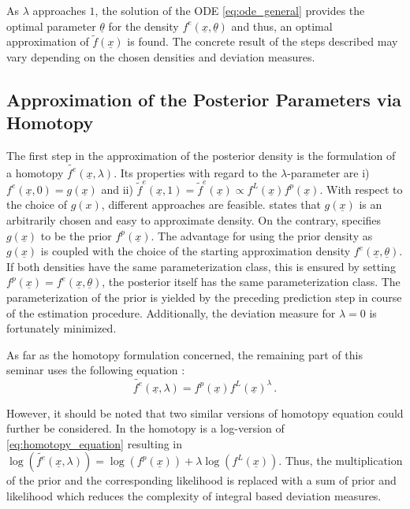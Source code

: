\documentclass[a4paper]{IEEEtran}
\begin{document}
As $\lambda$ approaches $1$, the solution of the ODE \eqref{eq:ode_general} provides the optimal parameter $\underline{\theta}$ for the density $f^e(\underline{x}, \underline{\theta})$ and thus, an optimal approximation of $\tilde{f}(\underline{x})$ is found. The concrete result of the steps 
described may vary depending on the chosen densities and deviation measures.

\subsection{Approximation of the Posterior Parameters via Homotopy}
\label{ch:approx_posterior_homotopy}
 The first step in the approximation of the posterior density is the formulation of a homotopy $\tilde{f^e}(\underline{x},\lambda)$. 
 Its properties with regard to the $\lambda$-parameter are i) $f^e(\underline{x}, 0) = g(\underline{x})$ and ii) $\tilde{f}^e(\underline{x}, 1) = \tilde{f}^{e}(\underline{x}) \propto  f^{L}(\underline{x}) f^{p}(\underline{x})$.
 With respect to the choice of $g(x)$, different approaches are feasible. \cite{hanebeck2003} states that $g(\underline{x})$ is an arbitrarily chosen and easy to approximate density. On the contrary, \cite{hagmar2011} specifies $g(\underline{x})$ to be the prior
 $f^p(\underline{x})$. The advantage for using the prior density as $g(\underline{x})$ is coupled with the choice of the starting approximation density $f^e(\underline{x}, \underline{\theta})$. If both densities have the same parameterization class, this is ensured by setting
 $f^p(\underline{x}) = f^e(\underline{x}, \underline{\theta})$, the posterior itself has the same parameterization class. The parameterization of the prior is yielded by the preceding prediction step in course of the estimation procedure.
Additionally, the deviation measure for $\lambda = 0$ is fortunately minimized.

 As far as the homotopy formulation concerned, the remaining part of this seminar uses the following equation \cite{hagmar2011}:
 \begin{equation}
    \tilde{f^e}(\underline{x},\lambda) = f^p(\underline{x})f^L(\underline{x})^{\lambda} \,.
    \label{eq:homotopy_equation}
 \end{equation}

However, it should be noted that two similar versions of homotopy equation could further be considered. In \cite{daum2007} the homotopy is a log-version of \eqref{eq:homotopy_equation}
resulting in $\log(\tilde{f^e}(\underline{x},\lambda)) = \log(f^p(\underline{x})) + \lambda \log(f^L(\underline{x}))$. Thus, the multiplication of the prior and the corresponding likelihood is replaced with a sum of prior and likelihood which reduces the 
complexity of integral based deviation measures.
\end{document}
